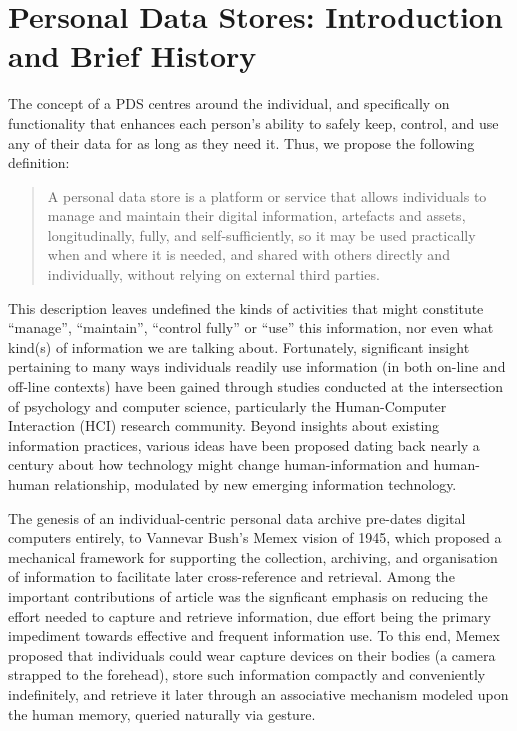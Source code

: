 \documentclass[runningheads,a4paper]{llncs}
\begin{document}
\section{Personal Data Stores: Introduction and Brief History}

The concept of a PDS centres around the individual, and specifically on functionality that enhances each person's ability to safely keep, control, and  use any of their data for as long as they need it. Thus, we propose the following definition:

\begin{quote}

	A personal data store is a platform or service that allows individuals to manage and maintain their digital information, artefacts and assets, longitudinally, fully, and self-sufficiently, so it may be used practically when and where it is needed, and shared with others directly and individually, without relying on external third parties. 

\end{quote}

This description leaves undefined the kinds of activities that might constitute ``manage'', ``maintain'', ``control fully'' or ``use'' this information, nor even what kind(s) of information we are talking about.  Fortunately, significant insight pertaining to many ways individuals readily use information (in both on-line and off-line contexts) have been gained through studies conducted at the intersection of psychology and computer science, particularly the Human-Computer Interaction (HCI) research community.  Beyond insights about existing information practices, various ideas have been proposed dating back nearly a century about how technology might change human-information and human-human relationship, modulated by new emerging information technology.

The genesis of an individual-centric personal data archive pre-dates digital computers entirely, to Vannevar Bush's Memex vision of 1945\cite{memex}, which proposed a mechanical framework for supporting the collection, archiving, and organisation of information to facilitate later cross-reference and retrieval.  Among the important contributions of article was the signficant emphasis on reducing the effort needed to capture and retrieve information, due effort being the primary impediment towards effective and frequent information use.  To this end, Memex proposed that individuals could wear capture devices on their bodies (a camera strapped to the forehead), store such information compactly and conveniently indefinitely, and retrieve it later through an associative mechanism modeled upon the human memory, queried naturally via gesture.
\end{document}
